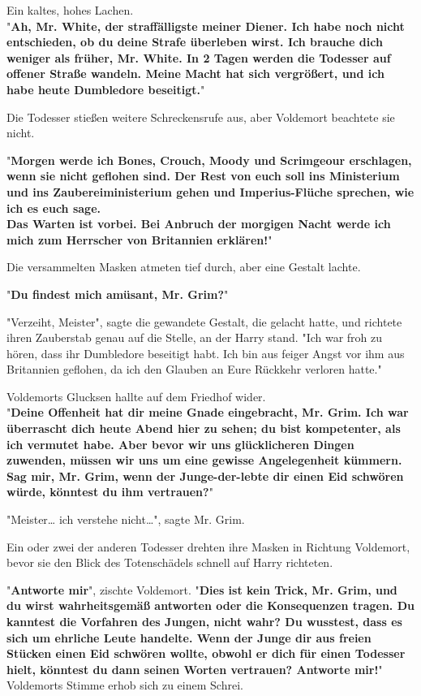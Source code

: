 {Ein kaltes, hohes Lachen.\\ "\textbf{Ah, Mr. White, der straffälligste meiner Diener. Ich habe noch nicht entschieden, ob du deine Strafe überleben wirst. Ich brauche dich weniger als früher, Mr. White. In 2 Tagen werden die Todesser auf offener Straße wandeln. Meine Macht hat sich vergrößert, und ich habe heute Dumbledore beseitigt.}"

Die Todesser stießen weitere Schreckensrufe aus, aber Voldemort beachtete sie nicht.

"\textbf{Morgen werde ich Bones, Crouch, Moody und Scrimgeour erschlagen, wenn sie nicht geflohen sind. Der Rest von euch soll ins Ministerium und ins Zaubereiministerium gehen und Imperius-Flüche sprechen, wie ich es euch sage.\\ Das Warten ist vorbei. Bei Anbruch der morgigen Nacht werde ich mich zum Herrscher von Britannien erklären!}"

Die versammelten Masken atmeten tief durch, aber eine Gestalt lachte.

"\textbf{Du findest mich amüsant, Mr. Grim?}"

"Verzeiht, Meister", sagte die gewandete Gestalt, die gelacht hatte, und richtete ihren Zauberstab genau auf die Stelle, an der Harry stand. "Ich war froh zu hören, dass ihr Dumbledore beseitigt habt. Ich bin aus feiger Angst vor ihm aus Britannien geflohen, da ich den Glauben an Eure Rückkehr verloren hatte."

Voldemorts Glucksen hallte auf dem Friedhof wider.\\ "\textbf{Deine Offenheit hat dir meine Gnade eingebracht, Mr. Grim. Ich war überrascht dich heute Abend hier zu sehen; du bist kompetenter, als ich vermutet habe. Aber bevor wir uns glücklicheren Dingen zuwenden, müssen wir uns um eine gewisse Angelegenheit kümmern. Sag mir, Mr. Grim, wenn der Junge-der-lebte dir einen Eid schwören würde, könntest du ihm vertrauen?}"

"Meister… ich verstehe nicht…", sagte Mr. Grim.

Ein oder zwei der anderen Todesser drehten ihre Masken in Richtung Voldemort, bevor sie den Blick des Totenschädels schnell auf Harry richteten.

"\textbf{Antworte mir}", zischte Voldemort. "\textbf{Dies ist kein Trick, Mr. Grim, und du wirst wahrheitsgemäß antworten oder die Konsequenzen tragen. Du kanntest die Vorfahren des Jungen, nicht wahr? Du wusstest, dass es sich um ehrliche Leute handelte. Wenn der Junge dir aus freien Stücken einen Eid schwören wollte, obwohl er dich für einen Todesser hielt, könntest du dann seinen Worten vertrauen? Antworte mir!}"\\ Voldemorts Stimme erhob sich zu einem Schrei.

}

